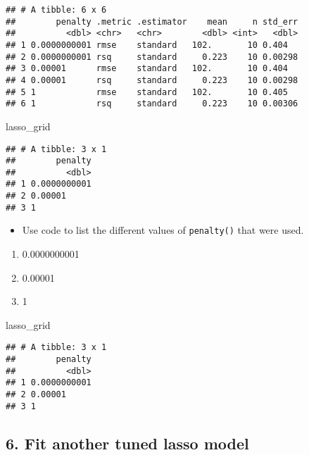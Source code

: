 \documentclass[
]{article}
\newenvironment{Shaded}{\begin{snugshade}}{\end{snugshade}}
\newcommand{\NormalTok}[1]{#1}
\providecommand{\tightlist}{%
  \setlength{\itemsep}{0pt}\setlength{\parskip}{0pt}}
\begin{document}
\begin{verbatim}
## # A tibble: 6 x 6
##        penalty .metric .estimator    mean     n std_err
##          <dbl> <chr>   <chr>        <dbl> <int>   <dbl>
## 1 0.0000000001 rmse    standard   102.       10 0.404  
## 2 0.0000000001 rsq     standard     0.223    10 0.00298
## 3 0.00001      rmse    standard   102.       10 0.404  
## 4 0.00001      rsq     standard     0.223    10 0.00298
## 5 1            rmse    standard   102.       10 0.405  
## 6 1            rsq     standard     0.223    10 0.00306
\end{verbatim}

\begin{Shaded}
\begin{Highlighting}[]
\NormalTok{lasso_grid}
\end{Highlighting}
\end{Shaded}

\begin{verbatim}
## # A tibble: 3 x 1
##        penalty
##          <dbl>
## 1 0.0000000001
## 2 0.00001     
## 3 1
\end{verbatim}

\begin{itemize}
\tightlist
\item
  Use code to list the different values of \texttt{penalty()} that were
  used.
\end{itemize}

\begin{enumerate}
\def\labelenumi{\arabic{enumi}.}
\tightlist
\item
  0.0000000001
\item
  0.00001\\
\item
  1
\end{enumerate}

\begin{Shaded}
\begin{Highlighting}[]
\NormalTok{lasso_grid}
\end{Highlighting}
\end{Shaded}

\begin{verbatim}
## # A tibble: 3 x 1
##        penalty
##          <dbl>
## 1 0.0000000001
## 2 0.00001     
## 3 1
\end{verbatim}

\hypertarget{fit-another-tuned-lasso-model}{%
\subsection{6. Fit another tuned lasso
model}\label{fit-another-tuned-lasso-model}}
\end{document}
